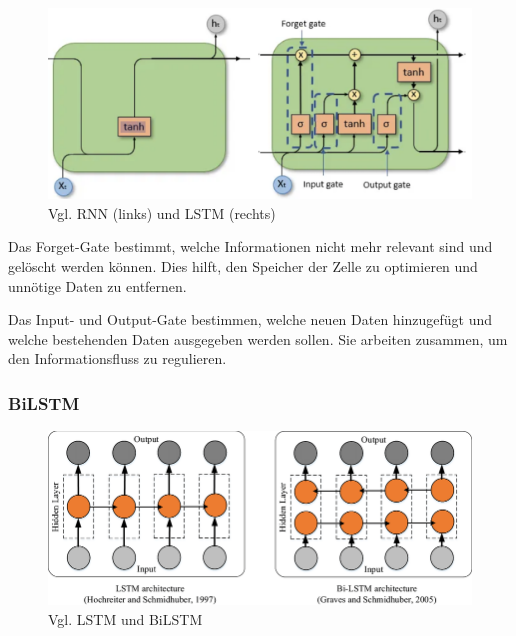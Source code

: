 \begin{figure}[htbp]
    \begin{center}
    \includegraphics[scale=0.4]{static/RNNvsLSTM.png}
    \caption{\label{fig:rnnvslstm} Vgl. RNN (links) und LSTM (rechts) \cite{aiml2025sequence}}
    \end{center}
\end{figure}

Das Forget-Gate bestimmt, welche Informationen nicht mehr relevant sind und gelöscht werden können. 
Dies hilft, den Speicher der Zelle zu optimieren und unnötige Daten zu entfernen.

Das Input- und Output-Gate bestimmen, welche neuen Daten hinzugefügt und welche bestehenden 
Daten ausgegeben werden sollen. Sie arbeiten zusammen, um den Informationsfluss zu regulieren.

\subsubsection{BiLSTM}

\begin{figure}[htbp]
    \begin{center}
        \includegraphics[scale=0.4]{static/lstmvsbilstm.png}
        \caption{\label{fig:lstmvsbilstm} Vgl. LSTM und BiLSTM \cite{shen2021}}
    \end{center}
\end{figure}


